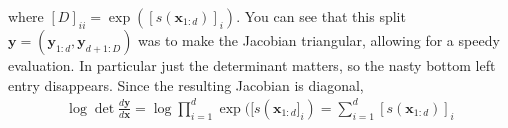 where $[D]_{ii} = \exp([s(\mathbf x_{1:d})]_i)$.
You can see that this split $\mathbf y = (\mathbf y_{1:d} , \mathbf y_{d+1: D})$ was to make the Jacobian triangular, allowing for a speedy evaluation. In particular just the determinant matters, so the nasty bottom left entry disappears. Since the resulting Jacobian is diagonal, 
\begin{align}
	\log \det \frac{d\mathbf y}{d\mathbf x} = \log \prod_{i=1}^d \exp([s(\mathbf x_{1:d}]_i) = \sum_{i=1}^d [s(\mathbf x_{1:d})]_i
\end{align}




















